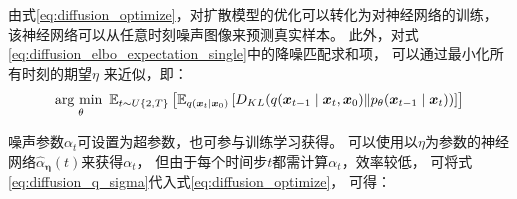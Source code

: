 由式{\ref{eq:diffusion_optimize}}，对扩散模型的优化可以转化为对神经网络的训练，
该神经网络可以从任意时刻噪声图像来预测真实样本。
此外，对式{\ref{eq:diffusion_elbo_expectation_single}}中的降噪匹配求和项，
可以通过最小化所有时刻的期望{$\eta$} 来近似，即：
\begin{equation}
    \label{eq:diffusion_minimize_expectation_over_all_timesteps_for_sum_of_denoising_Matching}
    \argmin_{\theta}\mathbb{E}_{t\sim U\{2,T\}}\left[
         \mathbb{E}_{q(\bm{x}_{t}\mid \bm{x}_0)} \left[ D_{KL}(q(\bm{x}_{t-1}\mid \bm{x}_{t},\bm{x}_0)\Vert p_{\theta}(\bm{x}_{t-1}\mid \bm{x}_{t}))  \right]
    \right]
\end{equation}

噪声参数{$\alpha_{t}$}可设置为超参数，也可参与训练学习获得。
可以使用以{$\eta$}为参数的神经网络{$\hat{\alpha}_{\bm{\eta}}(t)$}来获得{$\alpha_{t}$}，
但由于每个时间步{$t$}都需计算{$\alpha_{t}$}，效率较低，
可将式{\ref{eq:diffusion_q_sigma}}代入式{\ref{eq:diffusion_optimize}}，
可得：
